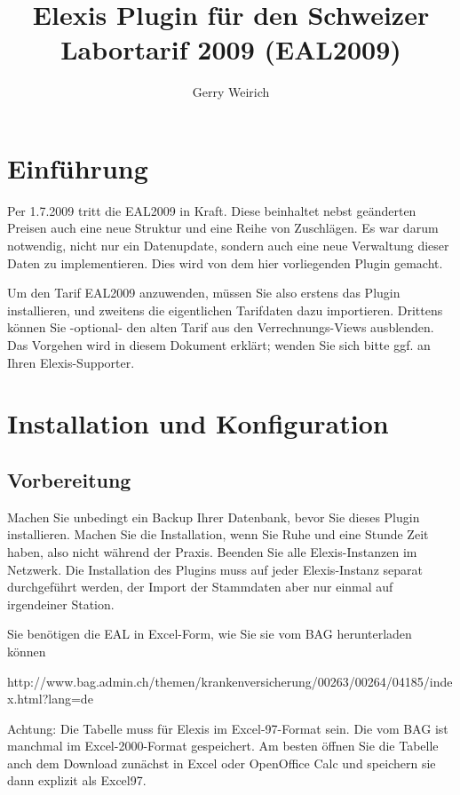 \documentclass[a4paper]{scrartcl}
\begin{document}
\title{Elexis Plugin für den Schweizer Labortarif 2009 (EAL2009)}
\author{Gerry Weirich}
\maketitle
\section{Einführung}
Per 1.7.2009 tritt die EAL2009 in Kraft. Diese beinhaltet nebst geänderten Preisen auch eine neue Struktur und eine Reihe von Zuschlägen. Es war darum notwendig, nicht nur ein Datenupdate, sondern auch eine neue Verwaltung dieser Daten zu implementieren. Dies wird von dem hier vorliegenden Plugin gemacht. 

\medskip

Um den Tarif EAL2009 anzuwenden, müssen Sie also erstens das Plugin installieren, und zweitens die eigentlichen Tarifdaten dazu importieren. Drittens können Sie -optional- den alten Tarif aus den Verrechnungs-Views ausblenden. Das Vorgehen wird in diesem Dokument erklärt; wenden Sie sich bitte ggf. an Ihren Elexis-Supporter.

\section{Installation und Konfiguration}

 \subsection{Vorbereitung}
 Machen Sie unbedingt ein Backup Ihrer Datenbank, bevor Sie dieses Plugin installieren. Machen Sie die Installation, wenn Sie Ruhe und eine Stunde Zeit haben, also nicht während der Praxis. Beenden Sie alle Elexis-Instanzen im Netzwerk. Die Installation des Plugins muss auf jeder Elexis-Instanz separat durchgeführt werden, der Import der Stammdaten aber nur einmal auf irgendeiner Station.
 
 \medskip
 
 Sie benötigen die EAL in Excel-Form, wie Sie sie vom BAG herunterladen können 
 

{\small http://www.bag.admin.ch/themen/krankenversicherung/00263/00264/04185/index.html?lang=de}

Achtung: Die Tabelle muss für Elexis im Excel-97-Format sein. Die vom BAG ist manchmal im Excel-2000-Format gespeichert. Am besten öffnen Sie die Tabelle anch dem Download zunächst in Excel oder OpenOffice Calc und speichern sie dann explizit als Excel97.
\end{document}
